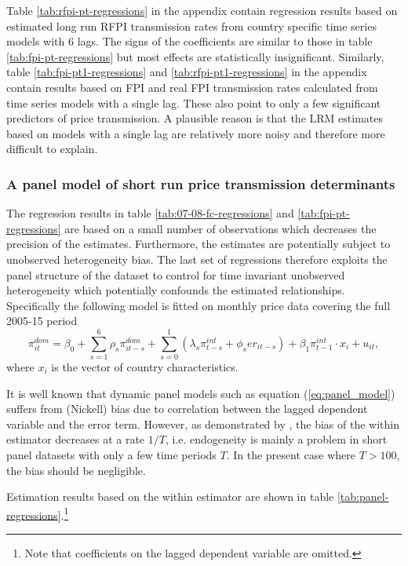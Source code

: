 \documentclass[12pt,english]{article}
\begin{document}
Table \ref{tab:rfpi-pt-regressions} in the appendix contain regression results based on estimated long run RFPI transmission rates from country specific time series models with 6 lags. The signs of the coefficients are similar to those in table \ref{tab:fpi-pt-regressions} but most effects are statistically insignificant. Similarly, table \ref{tab:fpi-pt1-regressions} and \ref{tab:rfpi-pt1-regressions} in the appendix contain results based on FPI and real FPI transmission rates calculated from time series models with a single lag. These also point to only a few significant predictors of price transmission. A plausible reason is that the LRM estimates based on models with a single lag are relatively more noisy and therefore more difficult to explain. 

\subsubsection{A panel model of short run price transmission determinants}
The regression results in table \ref{tab:07-08-fc-regressions} and \ref{tab:fpi-pt-regressions} are based on a small number of observations which decreases the precision of the estimates. Furthermore, the estimates are potentially subject to unobserved heterogeneity bias. The last set of regressions therefore exploits the panel structure of the dataset to control for time invariant unobserved heterogeneity which potentially confounds the estimated relationships. Specifically the following model is fitted on monthly price data covering the full 2005-15 period 
\begin{equation}
\pi_{it}^{dom}=\beta_{0}+
\sum_{s=1}^{6}\rho_{s}\pi_{it-s}^{dom}+
\sum_{s=0}^{1}(\lambda_{s}\pi_{t-s}^{int}+\phi_{s}er_{it-s})+
\beta_{1}\pi_{t-1}^{int}\cdot x_{i} +
u_{it}\label{eq:panel_model},
\end{equation}
where $x_{i}$ is the vector of country characteristics. 

It is well known that dynamic panel models such as equation (\ref{eq:panel_model}) suffers from (Nickell) bias due to correlation between the lagged dependent variable and the error term. However, as demonstrated by \citet{nickell81}, the bias of the within estimator decreases at a rate $1/T$, i.e. endogeneity is mainly a problem in short panel datasets with only a few time periods $T$. In the present case where $T>100$, the bias should be negligible.

Estimation results based on the within estimator are shown in table \ref{tab:panel-regressions}.\footnote{Note that coefficients on the lagged dependent variable are omitted.}
\end{document}
